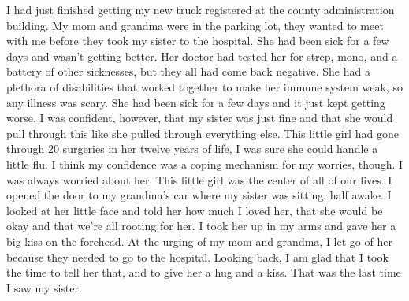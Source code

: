 \documentclass[12pt, letterpaper]{article}
\begin{document}
\begin{flushleft}
I had just finished getting my new truck registered
at the county administration building.
My mom and grandma were in the parking lot,
they wanted to meet with me before they took my sister to the hospital.
She had been sick for a few days and wasn’t getting better.
Her doctor had tested her for strep, mono, and a battery of other sicknesses,
but they all had come back negative.
She had a plethora of disabilities that worked together to make
her immune system weak, so any illness was scary.
She had been sick for a few days and it just kept getting worse.
I was confident, however, that my sister was just fine and that she would pull
through this like she pulled through everything else.
This little girl had gone through 20 surgeries in her twelve years of life,
I was sure she could handle a little flu.
I think my confidence was a coping mechanism for my worries, though.
I was always worried about her.
This little girl was the center of all of our lives.
I opened the door to my grandma’s car where my sister was sitting, half awake.
I looked at her little face and told her how much I loved her, that
she would be okay and that we’re all rooting for her.
I took her up in my arms and gave her a big kiss on the forehead.
At the urging of my mom and grandma,
I let go of her because they needed to go to the hospital.
Looking back, I am glad that I took the time to tell her that,
and to give her a hug and a kiss.
That was the last time I saw my sister. 
\vspace{5mm}





\end{flushleft}
\end{document}
